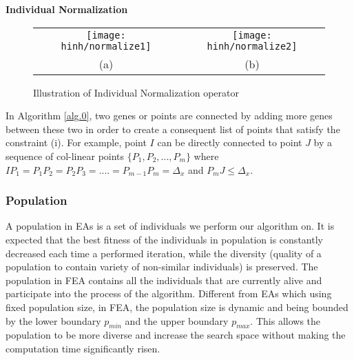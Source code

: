 \documentclass[final]{elsarticle}
\begin{document}
\begin{algorithm}[H]
	\SetAlgoLined
		\caption{\textbf{Individual Normalization}} 
		\label{alg.0}
\end{algorithm} 
\begin{figure*}[h]
	\begin{tabular}{cc}
		\texttt{[image: hinh/normalize1]}&\texttt{[image: hinh/normalize2]}\\
		(a) &(b)\\
	\end{tabular}
	\centering
	\caption{Illustration of Individual Normalization operator
	}
	\label{Fig.6}       %
\end{figure*}

In Algorithm \ref*{alg.0}, two genes or points are connected by adding more genes between these two in order to create a consequent list of points that satisfy the constraint (i). For example, point $ I $ can be directly connected to point $ J $ by a sequence of col-linear points $\{P_1,P_2,...,P_m\}$ where $IP_1=P_1P_2=P_2P_3=....=P_{m-1}P_m=\Delta_x$ and $P_mJ \leq \Delta_x$.\\

\subsubsection{Population}

A population in EAs is a set of individuals we perform our algorithm on. It is expected that the best fitness of the individuals in population is constantly decreased each time a performed iteration, while the diversity (quality of a population to contain variety of non-similar individuals) is preserved. The population in FEA contains all the individuals that are currently alive and participate into the process of the algorithm. Different from EAs which using fixed population size, in FEA, the population size is dynamic and being bounded by the lower boundary $p_{min}$ and the upper boundary $p_{max}$. This allows the population to be more diverse and increase the search space without making the computation time significantly risen.
\end{document}
